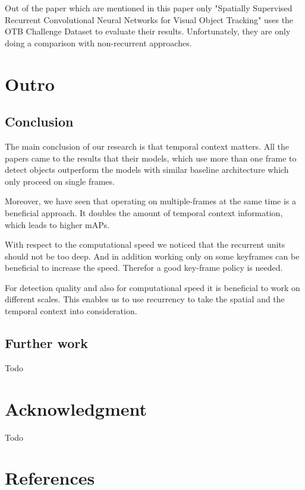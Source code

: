 \documentclass[conference]{IEEEtran}
\begin{document}
Out of the paper which are mentioned in this paper only "Spatially Supervised Recurrent Convolutional Neural Networks for Visual Object Tracking" uses the OTB Challenge Dataset to evaluate their results. Unfortunately, they are only doing a comparison with non-recurrent approaches. 

\section{Outro}

\subsection{Conclusion}
The main conclusion of our research is that temporal context matters. All the papers came to the results that their models, which use more than one frame to detect objects outperform the models with similar baseline architecture which only proceed on single frames. \newline

Moreover, we have seen that operating on multiple-frames at the same time is a beneficial approach. It doubles the amount of temporal context information, which leads to higher mAPs. \newline

With respect to the computational speed we noticed that the recurrent units should not be too deep. And in addition working only on some keyframes can be beneficial to increase the speed. Therefor a good key-frame policy is needed. \newline

For detection quality and also for computational speed it is beneficial to work on different scales. This enables us to use recurrency to take the spatial and the temporal context into consideration. 

\subsection{Further work}
Todo


\section*{Acknowledgment}
Todo

\section*{References}
\end{document}

